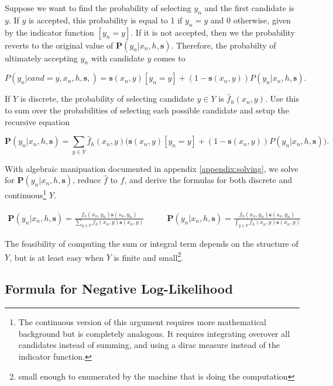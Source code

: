 \documentclass[twoside]{article}
\begin{document}
Suppose we want to find the probability of selecting \(y_n\) and the first candidate is \(y\). If \(y\) is accepted, this probability is equal to 1 if \(y_n = y\) and 0 otherwise, given by the indicator function \(\left [y_n = y\right ]\). If it is not accepted, then we the probability reverts to the original value of \(\mathbf{P}(y_n|x_n,h,\mathbf{s})\). Therefore, the probabilty of ultimately accepting \(y_n\) with candidate \(y\) comes to

\[P(y_n|cand=y,x_n,h,\mathbf{s},)=\mathbf{s}(x_n,y)\left [y_n = y\right ] + (1-\mathbf{s}(x_n,y))P(y_n|x_n,h,\mathbf{s}).\]

If \(Y\) is discrete, the probability of selecting candidate \(y \in Y\) is \(\hat{f}_h(x_n, y)\). Use this to sum over the probabilities of selecting each possible candidate and setup the recursive equation

\begin{equation}
\label{eq:bias_corrected_setup}
\mathbf{P}(y_n|x_n,h,\mathbf{s})=\sum_{y \in Y}\hat{f}_h(x_n,y)\big(\mathbf{s}(x_n,y)\left [y_n = y\right ] + (1-\mathbf{s}(x_n,y))P(y_n|x_n,h,\mathbf{s})\big).
\end{equation}

With algebraic manipuation documented in appendix \ref{appendix:solving}, we solve for \(\mathbf{P}(y_n|x_n,h,\mathbf{s})\), reduce \(\hat{f}\) to \(f\), and derive the formulas for both discrete and continuous\footnote{The continuous version of this argument requires more mathematical background but is completely analogous. It requires integrating overover all candidates instead of summing, and using a dirac measure instead of the indicator function.} \(Y\).

\begin{align}
\label{eq:bias_corrected_prob}
\mathbf{P}(y_n|x_n,h,\mathbf{s})=\frac{f_h(x_n,y_n)\mathbf{s}(s_n,y_n)}{\sum_{y \in Y}f_h(x_n,y)\mathbf{s}(x_n,y)} &
\qquad\mathbf{P}(y_n|x_n,h,\mathbf{s})=\frac{f_h(x_n,y_n)\mathbf{s}(s_n,y_n)}{\int_{y \in Y}f_h(x_n,y)\mathbf{s}(x_n,y)}
\end{align}

The feasibility of computing the sum or integral term depends on the structure of \(Y\), but is at least easy when \(Y\) is finite and small\footnote{small enough to enumerated by the machine that is doing the computation}.

\subsection{Formula for Negative Log-Likelihood}
\end{document}
